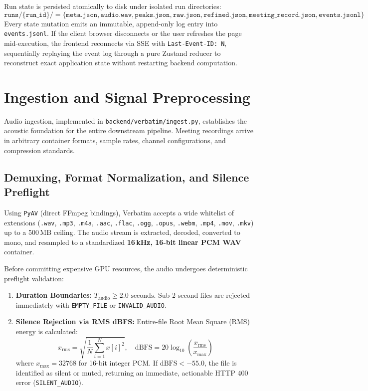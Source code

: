 \documentclass[10pt,a4paper]{article}
\begin{document}
Run state is persisted atomically to disk under isolated run directories:
\begin{equation}
\texttt{runs/\{run\_id\}/} = \{\texttt{meta.json}, \texttt{audio.wav}, \texttt{peaks.json}, \texttt{raw.json}, \texttt{refined.json}, \texttt{meeting\_record.json}, \texttt{events.jsonl}\}
\end{equation}
Every state mutation emits an immutable, append-only log entry into \texttt{events.jsonl}. If the client browser disconnects or the user refreshes the page mid-execution, the frontend reconnects via SSE with \texttt{Last-Event-ID: N}, sequentially replaying the event log through a pure Zustand reducer to reconstruct exact application state without restarting backend computation.

\section{Ingestion and Signal Preprocessing}
\label{sec:ingestion}

Audio ingestion, implemented in \texttt{backend/verbatim/ingest.py}, establishes the acoustic foundation for the entire downstream pipeline. Meeting recordings arrive in arbitrary container formats, sample rates, channel configurations, and compression standards.

\subsection{Demuxing, Format Normalization, and Silence Preflight}
Using \texttt{PyAV} (direct FFmpeg bindings), Verbatim accepts a wide whitelist of extensions (\texttt{.wav}, \texttt{.mp3}, \texttt{.m4a}, \texttt{.aac}, \texttt{.flac}, \texttt{.ogg}, \texttt{.opus}, \texttt{.webm}, \texttt{.mp4}, \texttt{.mov}, \texttt{.mkv}) up to a 500\,MB ceiling. The audio stream is extracted, decoded, converted to mono, and resampled to a standardized \textbf{16\,kHz, 16-bit linear PCM WAV} container.

Before committing expensive GPU resources, the audio undergoes deterministic preflight validation:
\begin{enumerate}
    \item \textbf{Duration Boundaries:} $T_{\text{audio}} \ge 2.0\text{ seconds}$. Sub-2-second files are rejected immediately with \texttt{EMPTY\_FILE} or \texttt{INVALID\_AUDIO}.
    \item \textbf{Silence Rejection via RMS dBFS:} Entire-file Root Mean Square (RMS) energy is calculated:
    \begin{equation}
    x_{\text{rms}} = \sqrt{\frac{1}{N} \sum_{i=1}^N x[i]^2}, \quad \text{dBFS} = 20 \log_{10}\left(\frac{x_{\text{rms}}}{x_{\text{max}}}\right)
    \end{equation}
    where $x_{\text{max}} = 32768$ for 16-bit integer PCM. If $\text{dBFS} < -55.0$, the file is identified as silent or muted, returning an immediate, actionable HTTP 400 error (\texttt{SILENT\_AUDIO}).
\end{enumerate}
\end{document}
